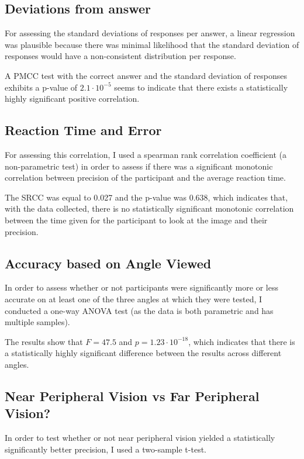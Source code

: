 \documentclass[12pt]{article}
\begin{document}
\subsection{Deviations from answer}

For assessing the standard deviations of responses per answer, a linear
regression was plausible because there was minimal likelihood that the standard
deviation of responses would have a non-consistent distribution per response.

A PMCC test with the correct answer and the standard deviation of responses
exhibits a p-value of $2.1 \cdot 10^{-5}$ seems to indicate that there exists a
statistically highly significant positive correlation.

\subsection{Reaction Time and Error}

For assessing this correlation, I used a spearman rank correlation coefficient
(a non-parametric test) in order to assess if there was a significant monotonic
correlation between precision of the participant and the average reaction time.

The SRCC was equal to 0.027 and the p-value was 0.638, which indicates that,
with the data collected, there is no statistically significant
monotonic correlation between the time given for the participant to look at the
image and their precision.

\subsection{Accuracy based on Angle Viewed}

In order to assess whether or not participants were significantly more or less
accurate on at least one of the three angles at which they were tested, I
conducted a one-way ANOVA test (as the data is both parametric and has multiple samples).

The results show that $F=47.5$ and $p = 1.23 \cdot 10^{-18}$, which indicates
that there is a statistically highly significant difference between the results across
different angles.

\subsection{Near Peripheral Vision vs Far Peripheral Vision?}

In order to test whether or not near peripheral vision yielded a statistically
significantly better precision, I used a two-sample t-test.
\end{document}

